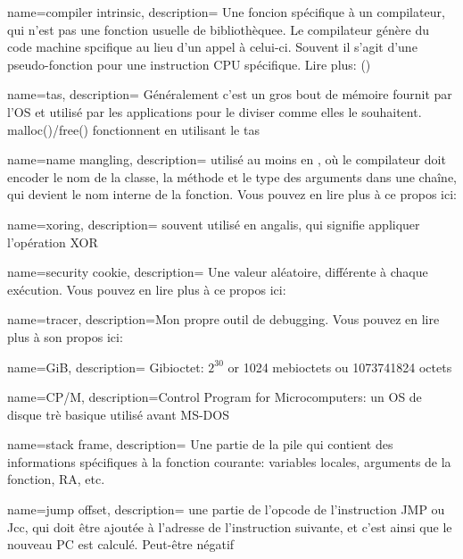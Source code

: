 {
{
  name=compiler intrinsic,
  description=
    {Une foncion spécifique à un compilateur, qui n'est pas une fonction usuelle de bibliothèquee.
    Le compilateur génère du code machine spcifique au lieu d'un appel à celui-ci.
    Souvent il s'agit d'une pseudo-fonction pour une instruction \ac{CPU} spécifique. Lire plus:
    ()
  }
}

{
  name={tas},
  description={
  Généralement c'est un gros bout de mémoire fournit par l'\ac{OS} et utilisé par
  les applications pour le diviser comme elles le souhaitent. malloc()/free() fonctionnent en utilisant le tas}
}

{
  name=name mangling,
  description={
  utilisé au moins en \Cpp, où le compilateur doit encoder le nom de la classe, la méthode et le type des arguments dans une chaîne,
  qui devient le nom interne de la fonction. Vous pouvez en lire plus à ce propos ici: }
}

{
  name=xoring,
  description=
  {souvent utilisé en angalis, qui signifie appliquer l'opération \ac{XOR}}
}

{
  name=security cookie,
  description={
  Une valeur aléatoire, différente à chaque exécution. Vous pouvez en lire plus à ce propos ici: }
}

{
  name=tracer,
  description={Mon propre outil de debugging. Vous pouvez en lire plus à son propos ici: }
}

{
  name=GiB,
  description={
  Gibioctet: $2^{30}$ or 1024 mebioctets ou 1073741824 octets
  }
}

{
  name=CP/M,
  description={Control Program for Microcomputers: 
  un \ac{OS} de disque trè basique utilisé avant MS-DOS}
}

{
  name=stack frame,
  description={
  Une partie de la pile qui contient des informations spécifiques à la fonction courante:
  variables locales, arguments de la fonction, \ac{RA}, etc.}
}

{
  name=jump offset,
  description={
  une partie de l'opcode de l'instruction JMP ou Jcc, qui doit être ajoutée à l'adresse de l'instruction suivante,
  et c'est ainsi que le nouveau \ac{PC} est calculé. Peut-être négatif
  }
}

}
